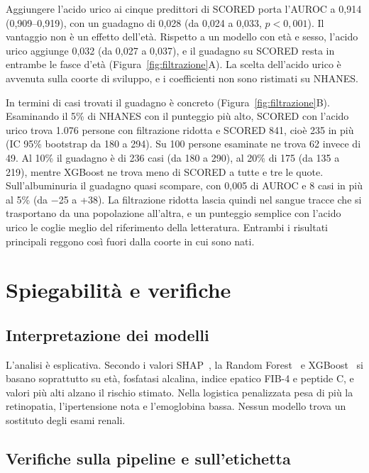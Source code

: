 \documentclass[a4paper, 12pt, oneside]{book}
\begin{document}
Aggiungere l'acido urico ai cinque predittori di SCORED porta l'AUROC a 0,914 (0,909--0,919), con un guadagno di 0,028 (da 0,024 a 0,033, $p < 0{,}001$). Il vantaggio non è un effetto dell'età. Rispetto a un modello con età e sesso, l'acido urico aggiunge 0,032 (da 0,027 a 0,037), e il guadagno su SCORED resta in entrambe le fasce d'età (Figura~\ref{fig:filtrazione}A). La scelta dell'acido urico è avvenuta sulla coorte di sviluppo, e i coefficienti non sono ristimati su NHANES.

In termini di casi trovati il guadagno è concreto (Figura~\ref{fig:filtrazione}B). Esaminando il 5\% di NHANES con il punteggio più alto, SCORED con l'acido urico trova 1.076 persone con filtrazione ridotta e SCORED 841, cioè 235 in più (IC 95\% bootstrap da 180 a 294). Su 100 persone esaminate ne trova 62 invece di 49. Al 10\% il guadagno è di 236 casi (da 180 a 290), al 20\% di 175 (da 135 a 219), mentre XGBoost ne trova meno di SCORED a tutte e tre le quote. Sull'albuminuria il guadagno quasi scompare, con 0,005 di AUROC e 8 casi in più al 5\% (da $-$25 a +38). La filtrazione ridotta lascia quindi nel sangue tracce che si trasportano da una popolazione all'altra, e un punteggio semplice con l'acido urico le coglie meglio del riferimento della letteratura. Entrambi i risultati principali reggono così fuori dalla coorte in cui sono nati.

\section{Spiegabilità e verifiche}

\subsection{Interpretazione dei modelli}

L'analisi è esplicativa. Secondo i valori SHAP~\cite{lundberg_unified_2017}, la Random Forest~\cite{breiman_random_2001} e XGBoost~\cite{chen_xgboost_2016} si basano soprattutto su età, fosfatasi alcalina, indice epatico FIB-4 e peptide C, e valori più alti alzano il rischio stimato. Nella logistica penalizzata pesa di più la retinopatia, l'ipertensione nota e l'emoglobina bassa. Nessun modello trova un sostituto degli esami renali.

\subsection{Verifiche sulla pipeline e sull'etichetta}
\end{document}
